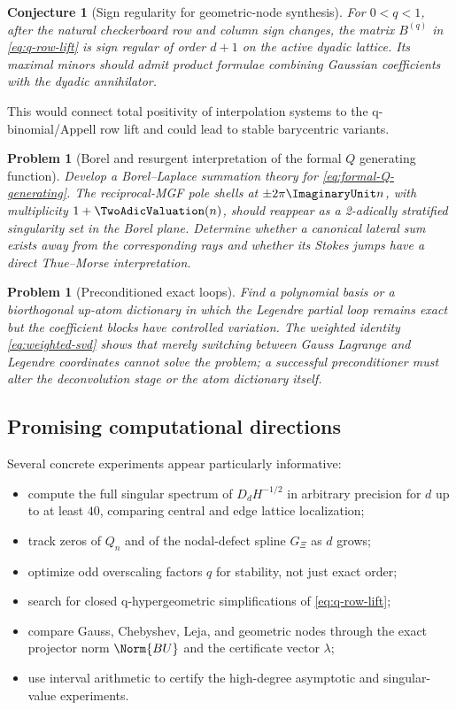 \documentclass[11pt]{article}
\newtheorem{conjecture}[theorem]{Conjecture}
\newtheorem{problem}[theorem]{Problem}
\theoremstyle{definition}
\theoremstyle{remark}
\begin{document}
\begin{conjecture}[Sign regularity for geometric-node synthesis]
\label{conj:q-total-positivity}
For $0<q<1$, after the natural checkerboard row and column sign changes, the
matrix $B^{(q)}$ in \eqref{eq:q-row-lift} is sign regular of order $d+1$ on the
active dyadic lattice.  Its maximal minors should admit product formulae
combining Gaussian coefficients with the dyadic annihilator.
\end{conjecture}

This would connect total positivity of interpolation systems to the
q-binomial/Appell row lift and could lead to stable barycentric variants.

\begin{problem}[Borel and resurgent interpretation of the formal \texorpdfstring{$Q$}{Q} generating function]
\label{prob:Borel}
Develop a Borel--Laplace summation theory for
\eqref{eq:formal-Q-generating}.  The reciprocal-MGF pole shells at
$\pm2\pi\ImaginaryUnit n$, with multiplicity $1+\TwoAdicValuation(n)$, should reappear as a
2-adically stratified singularity set in the Borel plane.  Determine whether a
canonical lateral sum exists away from the corresponding rays and whether its
Stokes jumps have a direct Thue--Morse interpretation.
\end{problem}

\begin{problem}[Preconditioned exact loops]
\label{prob:preconditioned-loop}
Find a polynomial basis or a biorthogonal up-atom dictionary in which the
Legendre partial loop remains exact but the coefficient blocks have controlled
variation.  The weighted identity \eqref{eq:weighted-svd} shows that merely
switching between Gauss Lagrange and Legendre coordinates cannot solve the
problem; a successful preconditioner must alter the deconvolution stage or the
atom dictionary itself.
\end{problem}

\subsection{Promising computational directions}

Several concrete experiments appear particularly informative:
\begin{itemize}
  \item compute the full singular spectrum of $D_dH^{-1/2}$ in arbitrary
  precision for $d$ up to at least $40$, comparing central and edge lattice
  localization;
  \item track zeros of $Q_n$ and of the nodal-defect spline $G_\Xi$ as $d$
  grows;
  \item optimize odd overscaling factors $q$ for stability, not just exact
  order;
  \item search for closed q-hypergeometric simplifications of
  \eqref{eq:q-row-lift};
  \item compare Gauss, Chebyshev, Leja, and geometric nodes through the exact
  projector norm $\Norm{BU}$ and the certificate vector $\lambda$;
  \item use interval arithmetic to certify the high-degree asymptotic and
  singular-value experiments.
\end{itemize}
\end{document}
